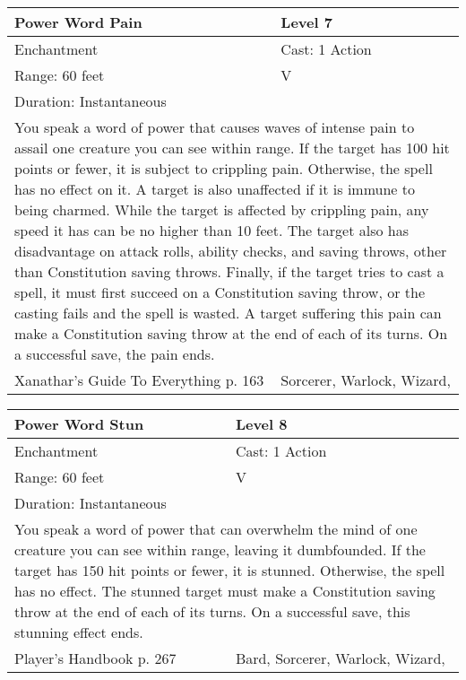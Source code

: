 \documentclass[11pt]{report}
\begin{document}
\begin{table}[H]
	\begin{tabular}{||p{6cm}|p{6cm}||}
		\hline\hline
		\bf{Power Word Pain} & Level 7\\ \hline
		Enchantment & Cast: 1 Action\\ \hline
		Range: 60 feet & V\\ \hline
		Duration: Instantaneous & \\ \hline
		\multicolumn{2}{||p{12cm}||}{You speak a word of power that causes waves of intense pain to assail one creature you can see within range. If the target has 100 hit points or fewer, it is subject to crippling pain. Otherwise, the spell has no effect on it. A target is also unaffected if it is immune to being charmed.
While the target is affected by crippling pain, any speed it has can be no higher than 10 feet. The target also has disadvantage on attack rolls, ability checks, and saving throws, other than Constitution saving throws. Finally, if the target tries to cast a spell, it must first succeed on a Constitution saving throw, or the casting fails and the spell is wasted.
A target suffering this pain can make a Constitution saving throw at the end of each of its turns. On a successful save, the pain ends.}\\ \hline
Xanathar's Guide To Everything p. 163 & Sorcerer, Warlock, Wizard, \\ \hline\hline
	\end{tabular}
\end{table}

\begin{table}[H]
	\begin{tabular}{||p{6cm}|p{6cm}||}
		\hline\hline
		\bf{Power Word Stun} & Level 8\\ \hline
		Enchantment & Cast: 1 Action\\ \hline
		Range: 60 feet & V\\ \hline
		Duration: Instantaneous & \\ \hline
		\multicolumn{2}{||p{12cm}||}{You speak a word of power that can overwhelm the mind of one creature you can see within range, leaving it dumbfounded. If the target has 150 hit points or fewer, it is stunned. Otherwise, the spell has no effect. The stunned target must make a Constitution saving throw at the end of each of its turns. On a successful save, this stunning effect ends.}\\ \hline
Player's Handbook p. 267 & Bard, Sorcerer, Warlock, Wizard, \\ \hline\hline
	\end{tabular}
\end{table}
\end{document}
